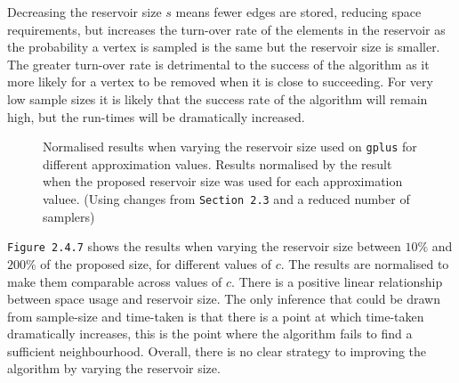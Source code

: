 \documentclass[11pt,twoside,a4paper]{report}
\begin{document}
\par Decreasing the reservoir size $s$ means fewer edges are stored, reducing space requirements, but increases the turn-over rate of the elements in the reservoir as the probability a vertex is sampled is the same but the reservoir size is smaller. The greater turn-over rate is detrimental to the success of the algorithm as it more likely for a vertex to be removed when it is close to succeeding. For very low sample sizes it is likely that the success rate of the algorithm will remain high, but the run-times will be dramatically increased.

\begin{figure}[H]
	\label{Figure 8}
	\caption{Normalised results when varying the reservoir size used on \texttt{gplus} for different approximation values. Results normalised by the result when the proposed reservoir size was used for each approximation valuee. (Using changes from \texttt{Section 2.3} and a reduced number of samplers)}
\end{figure}

\par \texttt{Figure 2.4.7} shows the results when varying the reservoir size between $10\%$ and $200\%$ of the proposed size, for different values of $c$. The results are normalised to make them comparable across values of $c$. There is a positive linear relationship between space usage and reservoir size. The only inference that could be drawn from sample-size and time-taken is that there is a point at which time-taken dramatically increases, this is the point where the algorithm fails to find a sufficient neighbourhood. Overall, there is no clear strategy to improving the algorithm by varying the reservoir size.
\end{document}
